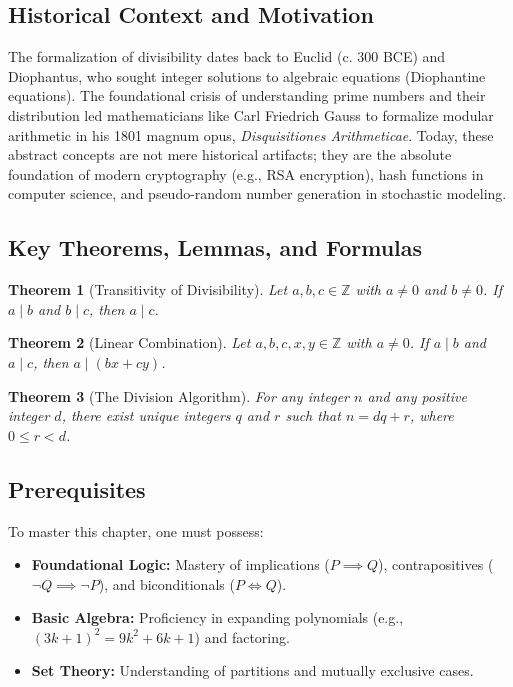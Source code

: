 \documentclass[11pt]{article}
\newtheorem{theorem}{Theorem}[section]
\theoremstyle{definition}
\theoremstyle{remark}
\newcommand{\Z}{\mathbb{Z}}
\begin{document}
\subsection{Historical Context and Motivation}
The formalization of divisibility dates back to Euclid (c. 300 BCE) and Diophantus, who sought integer solutions to algebraic equations (Diophantine equations). The foundational crisis of understanding prime numbers and their distribution led mathematicians like Carl Friedrich Gauss to formalize modular arithmetic in his 1801 magnum opus, \textit{Disquisitiones Arithmeticae}. Today, these abstract concepts are not mere historical artifacts; they are the absolute foundation of modern cryptography (e.g., RSA encryption), hash functions in computer science, and pseudo-random number generation in stochastic modeling.

\subsection{Key Theorems, Lemmas, and Formulas}
\begin{theorem}[Transitivity of Divisibility]
Let $a, b, c \in \Z$ with $a \neq 0$ and $b \neq 0$. If $a \mid b$ and $b \mid c$, then $a \mid c$.
\end{theorem}

\begin{theorem}[Linear Combination]
Let $a, b, c, x, y \in \Z$ with $a \neq 0$. If $a \mid b$ and $a \mid c$, then $a \mid (bx + cy)$.
\end{theorem}

\begin{theorem}[The Division Algorithm]
For any integer $n$ and any positive integer $d$, there exist unique integers $q$ and $r$ such that $n = dq + r$, where $0 \leq r < d$.
\end{theorem}

\subsection{Prerequisites}
To master this chapter, one must possess:
\begin{itemize}
    \item \textbf{Foundational Logic:} Mastery of implications ($P \implies Q$), contrapositives ($\neg Q \implies \neg P$), and biconditionals ($P \iff Q$).
    \item \textbf{Basic Algebra:} Proficiency in expanding polynomials (e.g., $(3k+1)^2 = 9k^2 + 6k + 1$) and factoring.
    \item \textbf{Set Theory:} Understanding of partitions and mutually exclusive cases.
\end{itemize}
\end{document}
